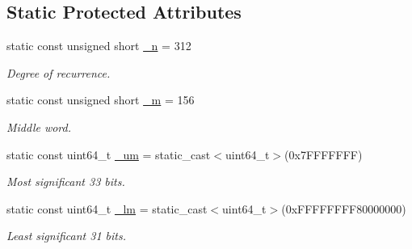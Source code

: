 \subsection*{Static Protected Attributes}
\begin{DoxyCompactItemize}
\item 
\mbox{\label{classsamp_files_1_1_generate_m_t_a1baccbd00a9ba762e624a13bfa79a6c7}} 
static const unsigned short \hyperlink{classsamp_files_1_1_generate_m_t_a1baccbd00a9ba762e624a13bfa79a6c7}{\+\_\+n} = 312
\begin{DoxyCompactList}\small\item\em Degree of recurrence. \end{DoxyCompactList}\item 
\mbox{\label{classsamp_files_1_1_generate_m_t_aa0f8cc15e9726d931e5042e16be55cf9}} 
static const unsigned short \hyperlink{classsamp_files_1_1_generate_m_t_aa0f8cc15e9726d931e5042e16be55cf9}{\+\_\+m} = 156
\begin{DoxyCompactList}\small\item\em Middle word. \end{DoxyCompactList}\item 
\mbox{\label{classsamp_files_1_1_generate_m_t_add38df40f5c48eedb86eb1bf8f4fb67e}} 
static const uint64\+\_\+t \hyperlink{classsamp_files_1_1_generate_m_t_add38df40f5c48eedb86eb1bf8f4fb67e}{\+\_\+um} = static\+\_\+cast$<$uint64\+\_\+t$>$(0x7\+F\+F\+F\+F\+F\+F\+F)
\begin{DoxyCompactList}\small\item\em Most significant 33 bits. \end{DoxyCompactList}\item 
\mbox{\label{classsamp_files_1_1_generate_m_t_a69615e65ec1e10bbac2da0c4ec4f8b20}} 
static const uint64\+\_\+t \hyperlink{classsamp_files_1_1_generate_m_t_a69615e65ec1e10bbac2da0c4ec4f8b20}{\+\_\+lm} = static\+\_\+cast$<$uint64\+\_\+t$>$(0x\+F\+F\+F\+F\+F\+F\+F\+F80000000)
\begin{DoxyCompactList}\small\item\em Least significant 31 bits. \end{DoxyCompactList}\item 
\mbox{\label{classsamp_files_1_1_generate_m_t_a5a90cd28215ac0b3272c1a3480bf56ce}} 

\end{DoxyCompactItemize}

